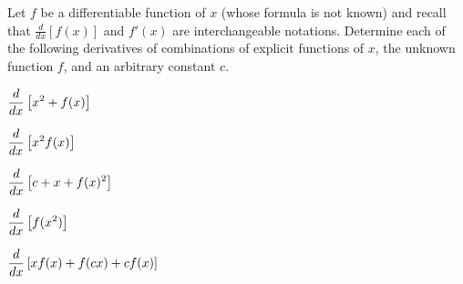 \begin{pa} \label{PA:2.7}
Let $f$ be a differentiable function of $x$ (whose formula is not known) and recall that $\frac{d}{dx}[f(x)]$ and $f'(x)$ are interchangeable notations.  Determine each of the following derivatives of combinations of explicit functions of $x$, the unknown function $f$, and an arbitrary constant $c$.
\ba
	\item $\displaystyle \frac{d}{dx} \left[ x^2 + f(x) \right]$
	\item $\displaystyle \frac{d}{dx} \left[ x^2 f(x) \right]$
	\item $\displaystyle \frac{d}{dx} \left[ c + x + f(x)^2 \right]$
	\item $\displaystyle \frac{d}{dx} \left[ f(x^2) \right]$
	\item $\displaystyle \frac{d}{dx} \left[ xf(x) + f(cx) + cf(x) \right]$
\ea
\end{pa} 
\afterpa